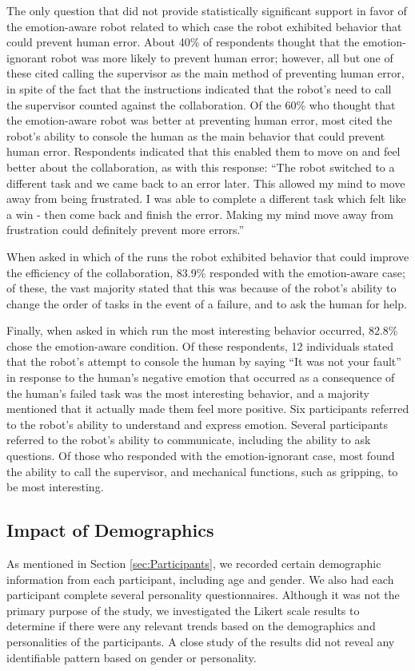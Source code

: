 \documentclass[12pt]{report}
\begin{document}
The only question that did not provide statistically significant support in
favor of the emotion-aware robot related to which case the robot exhibited
behavior that could prevent human error. About 40\% of respondents thought that
the emotion-ignorant robot was more likely to prevent human error; however, all
but one of these cited calling the supervisor as the main method of preventing
human error, in spite of the fact that the instructions indicated that the
robot's need to call the supervisor counted against the collaboration. Of the
60\% who thought that the emotion-aware robot was better at preventing human
error, most cited the robot's ability to console the human as the main behavior
that could prevent human error. Respondents indicated that this enabled them to
move on and feel better about the collaboration, as with this response: ``The
robot switched to a different task and we came back to an error later. This
allowed my mind to move away from being frustrated. I was able to complete a
different task which felt like a win - then come back and finish the error.
Making my mind move away from frustration could definitely prevent more
errors.''

When asked in which of the runs the robot exhibited behavior that could improve
the efficiency of the collaboration, 83.9\% responded with the emotion-aware
case; of these, the vast majority stated that this was because of the robot's
ability to change the order of tasks in the event of a failure, and to ask the
human for help.

Finally, when asked in which run the most interesting behavior occurred, 82.8\%
chose the emotion-aware condition. Of these respondents, 12 individuals stated
that the robot's attempt to console the human by saying ``It was not your
fault'' in response to the human's negative emotion that occurred as a
consequence of the human's failed task was the most interesting behavior, and a
majority mentioned that it actually made them feel more positive. Six
participants referred to the robot's ability to understand and express emotion.
Several participants referred to the robot's ability to communicate, including
the ability to ask questions. Of those who responded with the emotion-ignorant
case, most found the ability to call the supervisor, and mechanical functions,
such as gripping, to be most interesting.

\subsection{Impact of Demographics} 
As mentioned in Section \ref{sec:Participants}, we recorded certain demographic
information from each participant, including age and gender. We also had each
participant complete several personality questionnaires. Although it was not the
primary purpose of the study, we investigated the Likert scale results to
determine if there were any relevant trends based on the demographics and
personalities of the participants. A close study of the results did  not reveal
any identifiable pattern based on gender or personality.
\end{document}
